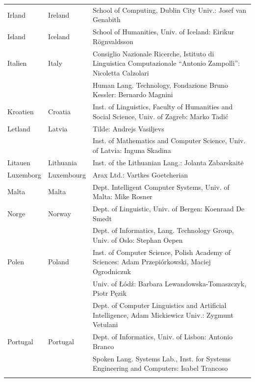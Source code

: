 \documentclass[]{../../metanetpaper}
\begin{document}
\begin{longtable}{llp{105mm}}
  Irland & \textcolor{grey1}{Ireland} & School of Computing, Dublin City Univ.: Josef van Genabith\\ \addlinespace
  Island & \textcolor{grey1}{Iceland} & School of Humanities, Univ. of Iceland: Eirikur Rögnvaldsson\\ \addlinespace
  Italien & \textcolor{grey1}{Italy} & Consiglio Nazionale Ricerche, Istituto di Linguistica Computazionale “Antonio Zampolli”: Nicoletta Calzolari\\ \addlinespace
  & & Human Lang. Technology, Fondazione Bruno Kessler: Bernardo Magnini\\ \addlinespace 
  Kroatien & \textcolor{grey1}{Croatia} & Inst. of Linguistics, Faculty of Humanities and Social Science, Univ. of Zagreb: Marko Tadić \\ \addlinespace
  Letland & \textcolor{grey1}{Latvia} & Tilde: Andrejs Vasiljevs\\ \addlinespace 
  & & Inst. of Mathematics and Computer Science, Univ. of Latvia: Inguna Skadina\\ \addlinespace
  Litauen & \textcolor{grey1}{Lithuania} & Inst. of the Lithuanian Lang.: Jolanta Zabarskaitė\\ \addlinespace
  Luxemborg & \textcolor{grey1}{Luxembourg} & Arax Ltd.: Vartkes Goetcherian\\ \addlinespace
  Malta & \textcolor{grey1}{Malta} & Dept. Intelligent Computer Systems, Univ. of Malta: Mike Rosner\\ \addlinespace
  Norge & \textcolor{grey1}{Norway} & Dept. of Linguistic, Univ. of Bergen: Koenraad De Smedt\\ \addlinespace 
  & & Dept. of Informatics, Lang. Technology Group, Univ. of Oslo: Stephan Oepen \\ \addlinespace
  Polen & \textcolor{grey1}{Poland} & Inst. of Computer Science, Polish Academy of Sciences: Adam Przepiórkowski, Maciej Ogrodniczuk \\ \addlinespace
  & & Univ. of Łódź: Barbara Lewandowska-Tomaszczyk, Piotr Pęzik\\ \addlinespace
  & & Dept. of Computer Linguistics and Artificial Intelligence, Adam Mickiewicz Univ.: Zygmunt Vetulani \\ \addlinespace
  Portugal & \textcolor{grey1}{Portugal} & Dept. of Informatics, Univ. of Lisbon: Antonio Branco\\ \addlinespace
  & & Spoken Lang. Systems Lab., Inst. for Systems Engineering and Computers: Isabel Trancoso \\ \addlinespace

\end{longtable}
\end{document}
